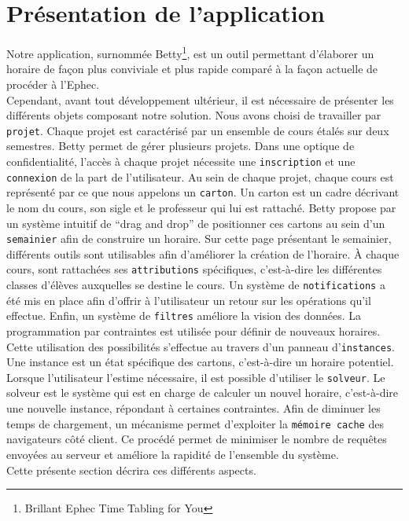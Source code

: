 

\chapter{Présentation de l'application}
Notre application, surnommée Betty\footnote{Brillant Ephec Time Tabling for You}, est un outil permettant d'élaborer un horaire de façon plus conviviale et plus rapide comparé à la façon actuelle de procéder à l'Ephec.\\
\newline
\indent
Cependant, avant tout développement ultérieur, il est nécessaire de présenter les différents objets composant notre solution. Nous avons choisi de travailler par \texttt{projet}. Chaque projet est caractérisé par un ensemble de cours étalés sur deux semestres. Betty permet de gérer plusieurs projets. Dans une optique de confidentialité, l'accès à chaque projet nécessite une \texttt{inscription} et une \texttt{connexion} de la part de l'utilisateur.
\newline
\indent
Au sein de chaque projet, chaque cours est représenté par ce que nous appelons un \texttt{carton}. Un carton est un cadre décrivant le nom du cours, son sigle et le professeur qui lui est rattaché. Betty propose par un système intuitif de \enquote{drag and drop} de positionner ces cartons au sein d'un \texttt{semainier} afin de construire un horaire.
\newline
\indent
Sur cette page présentant le semainier, différents outils sont utilisables afin d'améliorer la création de l'horaire. À chaque cours, sont rattachées ses \texttt{attributions} spécifiques, c'est-à-dire les différentes classes d'élèves auxquelles se destine le cours. Un système de \texttt{notifications} a été mis en place afin d'offrir à l'utilisateur un retour sur les opérations qu'il effectue. Enfin, un système de \texttt{filtres} améliore la vision des données. 
\newline
\indent
La programmation par contraintes est utilisée pour définir de nouveaux horaires. Cette utilisation des possibilités s'effectue au travers d'un panneau d'\texttt{instances}. Une instance  est un état spécifique des cartons, c'est-à-dire un horaire potentiel. Lorsque l'utilisateur l'estime nécessaire, il est possible d'utiliser le  \texttt{solveur}. Le solveur est le système qui est en charge de calculer un nouvel horaire, c'est-à-dire une nouvelle instance, répondant à certaines contraintes.
\newline
\indent
Afin de diminuer les temps de chargement, un mécanisme permet d'exploiter la \texttt{mémoire cache} des navigateurs côté client. Ce procédé permet de minimiser le nombre de requêtes envoyées au serveur et améliore la rapidité de l'ensemble du système.\\
\newline
\indent
Cette présente section décrira ces différents aspects.


